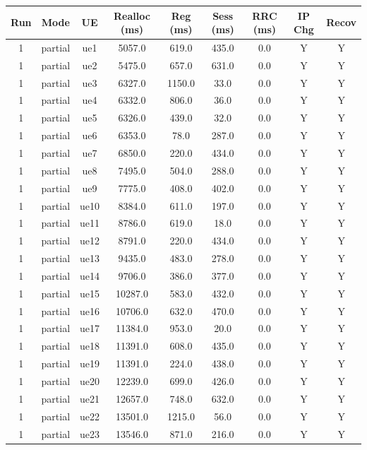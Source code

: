 \begin{table}[ht]
\centering
\begin{tabular}{|c|c|c|c|c|c|c|c|c|}
\hline
Run & Mode & UE & Realloc (ms) & Reg (ms) & Sess (ms) & RRC (ms) & IP Chg & Recov \\
\hline
1 & partial & ue1 & 5057.0 & 619.0 & 435.0 & 0.0 & Y & Y \\
1 & partial & ue2 & 5475.0 & 657.0 & 631.0 & 0.0 & Y & Y \\
1 & partial & ue3 & 6327.0 & 1150.0 & 33.0 & 0.0 & Y & Y \\
1 & partial & ue4 & 6332.0 & 806.0 & 36.0 & 0.0 & Y & Y \\
1 & partial & ue5 & 6326.0 & 439.0 & 32.0 & 0.0 & Y & Y \\
1 & partial & ue6 & 6353.0 & 78.0 & 287.0 & 0.0 & Y & Y \\
1 & partial & ue7 & 6850.0 & 220.0 & 434.0 & 0.0 & Y & Y \\
1 & partial & ue8 & 7495.0 & 504.0 & 288.0 & 0.0 & Y & Y \\
1 & partial & ue9 & 7775.0 & 408.0 & 402.0 & 0.0 & Y & Y \\
1 & partial & ue10 & 8384.0 & 611.0 & 197.0 & 0.0 & Y & Y \\
1 & partial & ue11 & 8786.0 & 619.0 & 18.0 & 0.0 & Y & Y \\
1 & partial & ue12 & 8791.0 & 220.0 & 434.0 & 0.0 & Y & Y \\
1 & partial & ue13 & 9435.0 & 483.0 & 278.0 & 0.0 & Y & Y \\
1 & partial & ue14 & 9706.0 & 386.0 & 377.0 & 0.0 & Y & Y \\
1 & partial & ue15 & 10287.0 & 583.0 & 432.0 & 0.0 & Y & Y \\
1 & partial & ue16 & 10706.0 & 632.0 & 470.0 & 0.0 & Y & Y \\
1 & partial & ue17 & 11384.0 & 953.0 & 20.0 & 0.0 & Y & Y \\
1 & partial & ue18 & 11391.0 & 608.0 & 435.0 & 0.0 & Y & Y \\
1 & partial & ue19 & 11391.0 & 224.0 & 438.0 & 0.0 & Y & Y \\
1 & partial & ue20 & 12239.0 & 699.0 & 426.0 & 0.0 & Y & Y \\
1 & partial & ue21 & 12657.0 & 748.0 & 632.0 & 0.0 & Y & Y \\
1 & partial & ue22 & 13501.0 & 1215.0 & 56.0 & 0.0 & Y & Y \\
1 & partial & ue23 & 13546.0 & 871.0 & 216.0 & 0.0 & Y & Y \\

\end{tabular}
\end{table}
